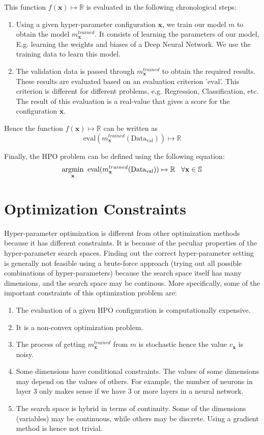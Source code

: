 \documentclass[11pt]{report}
\begin{document}
This function $f(\textbf{x}) \mapsto \mathbb{R}$ is evaluated in the following chronological steps:
\begin{enumerate}
\item Using a given hyper-parameter configuration $\textbf{x}$,  we train our model $m$ to obtain the model $m^{trained}_\textbf{x}$. It consists of learning the parameters of our model, E.g. learning the weights and biases of a Deep Neural Network.
We use the training data to learn this model.
\item The validation data is passed through $m^{trained}_\textbf{x}$ to obtain the required results.
These results are evaluated based on an evaluation criterion '$\textrm{eval}$'. This criterion is different for different problems, e.g. Regression, Classification, etc.
The result of this evaluation is a real-value that gives a score for the configuration $\textbf{x}$.
\end{enumerate}

Hence the function $f(\textbf{x}) \mapsto \mathbb{R}$ can be written as 
$$
\textrm{eval}(m^{trained}_\textbf{x} (\textrm{Data}_\textrm{val})) \mapsto \mathbb{R}
$$

Finally, the HPO problem can be defined using the following equation:
$$
\underset{\rm \textbf{x}}{\rm argmin} \;\; \textrm{eval}(m^{trained}_\textbf{x} (\textrm{Data}_\textrm{val})) \mapsto \mathbb{R}   \;\;\;  \forall \textbf{x} \in \mathbb{S}
$$

\label{ProblemOverviewlabel}
\section{Optimization Constraints}

Hyper-parameter optimization is different from other optimization methods because it has different constraints.
It is because of the peculiar properties of the hyper-parameter search spaces.
Finding out the correct hyper-parameter setting is generally not feasible using a brute-force approach (trying out all possible combinations of hyper-parameters) because the search space itself has many dimensions, and the search space may be continous.
More specifically,  some of the important constraints of this optimization problem are:

\begin{enumerate}
\item The evaluation of a given HPO configuration is computationally expensive.
\item It is a non-convex optimization problem.
\item The process of getting $m^{trained}_\textbf{x}$ from $m$ is stochastic hence the value $v_{\textbf{x}}$ is noisy.
\item Some dimensions have conditional constraints. The values of some dimensions may depend on the values of others. For example, the number of neurons in layer 3 only makes sense if we have 3 or more layers in a neural network.
\item The search space is hybrid in terms of continuity. Some of the dimensions (variables) may be continuous, while others may be discrete.
Using a gradient method is hence not trivial.
\end{enumerate}
\end{document}
